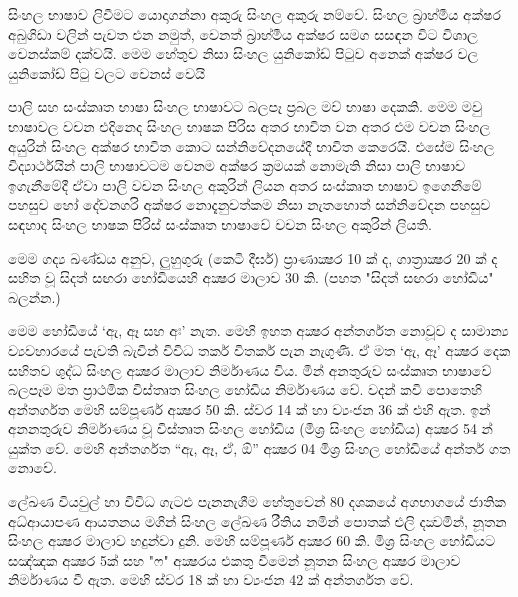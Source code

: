 \documentclass[a4paper,12pt,oneside,final]{article}
\begin{document}
සිංහල භාෂාව ලිවීමට යොදාගන්නා අකුරු සිංහල අකුරු නම්වේ. සිංහල බ්‍රාහ්මීය අක්ෂර අබුගිඩා වලින් පැවත එන නමුත්, වෙනත් බ්‍රාහ්මීය අක්ෂර සමග සසඳන විට විශාල වෙනස්කම් දක්වයි. මෙම හේතුව නිසා සිංහල යුනිකෝඩ් පිටුව අනෙක් අක්ෂර වල යුනිකෝඩ් පිටු වලට වෙනස් වෙයි

පාලි සහ සංස්කෘත භාෂා සිංහල භාෂාවට බලපෑ ප්‍රබල මව් භාෂා දෙකකි. මෙම මවු භාෂාවල වචන එදිනෙද සිංහල භාෂක පිරිස අතර භාවිත වන අතර එම වචන සිංහල අයුරින් සිංහල අක්ෂර භාවිත කොට සන්නිවේදනයේදී භාවිත කෙරෙයි. එසේම සිංහල විද්‍යාර්ථයින් පාලි භාෂාවටම වෙනම අක්ෂර ක්‍රමයක් නොමැති නිසා පාලි භාෂාව ඉගැනීමේදී ඒවා පාලි වචන සිංහල අකුරින් ලියන අතර සංස්කෘත භාෂාව ඉගෙනීමේ පහසුව හෝ දේවනගරි අක්ෂර නොදැනුවත්කම නිසා නැතහොත් සන්නිවේදන පහසුව සඳහාද සිංහල භාෂක පිරිස් සංස්කෘත භාෂාවේ වචන සිංහල අකුරින් ලියති.

මෙම ගද්‍ය ඛණ්ඩය අනුව, ලුහුගුරු (කෙටි දීර්ඝ) ප්‍රාණාක්‍ෂර 10 ක් ද, ගාත්‍රාක්‍ෂර 20 ක් ද සහිත වූ සිදත් සඟරා හෝඩියෙහි අක්‍ෂර මාලාව 30 කි. (පහත "සිදත් සඟරා හෝඩිය" බලන්න.)

මෙම හෝඩියේ ‘ඇ, ඈ සහ අඃ’ නැත. මෙහි ඉහත අක්‍ෂර අන්තර්ගත නොවූව ද සාමාන්‍ය ව්‍යවහාරයේ පැවති බැවින් විවිධ තර්ක විතර්ක පැන නැගුණි. ඒ මත ‘ඇ, ඈ’ අක්‍ෂර දෙක සහිතව ශුද්ධ සිංහල අක්‍ෂර මාලාව නිර්මාණය විය. මින් අනතුරුව සංස්කෘත භාෂාවේ බලපෑම මත ප්‍රාථමික විස්තෘත සිංහල හෝඩිය නිර්මාණය වේ. වදන් කවි පොතෙහි අන්තර්ගත මෙහි සම්පූර්ණ අක්‍ෂර 50 කි. ස්වර 14 ක් හා ව්‍යංජන 36 ක් එහි ඇත. ඉන් අනනතුරුව නිර්මාණය වූ විස්තෘත සිංහල හෝඩිය (මිශ්‍ර සිංහල හෝඩිය) අක්‍ෂර 54 න් යුක්ත වේ. මෙහි අන්තර්ගත “ඇ, ඈ, ඒ, ඕ” අක්‍ෂර 04 මිශ්‍ර සිංහල හෝඩියේ අන්තර් ගත නොවේ.

ලේඛණ වියවුල් හා විවිධ ගැටළු පැනනැගීම හේතුවෙන් 80 දශකයේ අගභාගයේ ජාතික අධ්ආ‍යාපණ ආයතනය මගින් සිංහල ලේඛණ රීතිය නමින් පොතක් එලි දක්‍වමින්, නූතන සිංහල අක්‍ෂර මාලාව හදුන්වා දුනි. මෙහි සම්පූර්ණ අක්‍ෂර 60 කි. මිශ්‍ර සිංහල හෝඩියට සඤ්ඤක අක්‍ෂර 5ක් සහ "ෆ" අක්‍ෂරය එකතු වීමෙන් නූතන සිංහල අක්‍ෂර මාලාව නිර්මාණය වී ඇත. මෙහි ස්වර 18 ක් හා ව්‍යංජන 42 ක් අන්තර්ගත වේ.
\end{document}
